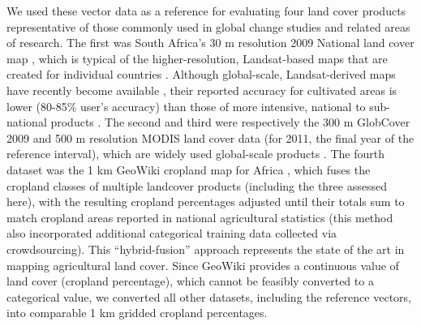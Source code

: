 \documentclass[a4paper]{article}
\begin{document}
We used these vector data as a reference for evaluating four land cover products representative of those commonly used in global change studies and related areas of research. The first was South Africa's 30 m resolution 2009 National land cover map \citep[SA-LC][]{sanbi_national_2009}, which is typical of the higher-resolution, Landsat-based maps that are created for individual countries \citep[e.g.][]{fry_completion_2009}. Although global-scale, Landsat-derived maps have recently become available \citep{chen_global_2015}, their reported accuracy for cultivated areas is lower (80-85\% user's accuracy) than those of more intensive, national to sub-national products \citep[e.g. 90\% user's accuracy][]{sweeney_mapping_2015}. The second and third were respectively the 300 m GlobCover 2009 \citep{arino_global_2012} and 500 m resolution MODIS land cover \citep{friedl_modis_2010} data (for 2011, the final year of the reference interval), which are widely used global-scale products \citep[e.g.][]{gross_monitoring_2013, shackelford_conservation_2015}. The fourth dataset was the 1 km GeoWiki cropland map for Africa \citep{fritz_mapping_2015}, which fuses the cropland classes of multiple landcover products (including the three assessed here), with the resulting cropland percentages adjusted until their totals sum to match cropland areas reported in national agricultural statistics (this method also incorporated additional categorical training data collected via crowdsourcing). This ``hybrid-fusion'' approach represents the state of the art in mapping agricultural land cover. Since GeoWiki provides a continuous value of land cover (cropland percentage), which cannot be feasibly converted to a categorical value, we converted all other datasets, including the reference vectors, into comparable 1 km gridded cropland percentages. 

\end{document}
